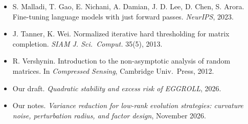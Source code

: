\documentclass[11pt]{article}
\begin{document}
{\begin{itemize}[leftmargin=2.2em,itemsep=0pt]
\item[{[14]}] S. Malladi, T. Gao, E. Nichani, A. Damian, J. D. Lee, D. Chen, S. Arora. Fine-tuning language models with just forward passes. \emph{NeurIPS}, 2023.
\item[{[15]}] J. Tanner, K. Wei. Normalized iterative hard thresholding for matrix completion. \emph{SIAM J. Sci.\ Comput.} 35(5), 2013.
\item[{[16]}] R. Vershynin. Introduction to the non-asymptotic analysis of random matrices. In \emph{Compressed Sensing}, Cambridge Univ.\ Press, 2012.
\item[{[D]}] Our draft. \emph{Quadratic stability and excess risk of EGGROLL}, 2026.
\item[{[N]}] Our notes. \emph{Variance reduction for low-rank evolution strategies: curvature noise, perturbation radius, and factor design}, November 2026.
\end{itemize}}

\newpage
\appendix

\end{document}

